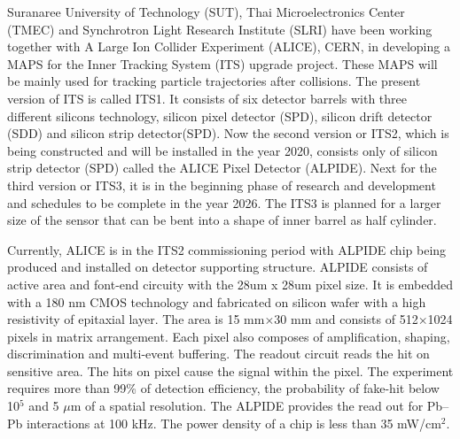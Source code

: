\documentclass[12pt,a4paper]{article}
\begin{document}
Suranaree University of Technology (SUT),  Thai Microelectronics Center (TMEC) and Synchrotron Light Research Institute (SLRI) have been working together with A Large Ion Collider Experiment (ALICE), CERN,  in developing a  MAPS for the Inner Tracking System (ITS) upgrade project.  These MAPS will be mainly used for tracking particle trajectories after collisions.  The present version of ITS is called ITS1. It consists of six detector barrels with three different silicons technology, silicon pixel detector (SPD), silicon drift detector (SDD) and silicon strip detector(SPD). Now the second version or ITS2,  which is being constructed and will be installed in the year 2020,  consists only of silicon strip detector (SPD) called the ALICE Pixel Detector (ALPIDE).  Next for the third version or ITS3, it is in the beginning phase of research and development and schedules to be complete in the year 2026. The ITS3 is planned for a larger size of the sensor that can be bent into a shape of inner barrel as half cylinder\cite{ALICE-PUBLIC-2018-013}. 

Currently, ALICE is in the ITS2 commissioning period with ALPIDE chip being produced and installed on detector supporting structure.  ALPIDE  consists of active area and font-end circuity with the   28um x 28um  pixel size.   It is embedded with a 180 nm CMOS technology and fabricated on silicon wafer with a high resistivity of epitaxial layer. The area is 15 mm×30 mm and consists of 512×1024 pixels in matrix arrangement. Each pixel also composes of amplification, shaping, discrimination and multi-event buffering. The readout circuit reads the hit on sensitive area. The hits on pixel cause the signal within the pixel. The experiment requires more than 99\% of detection efficiency, the probability of fake-hit below 10$^5$ and 5 $\mu$m of a spatial resolution. The ALPIDE provides the read out for Pb–Pb interactions at 100 kHz. The power density of a chip is less than 35 mW/cm$^2$.\cite{SNOEYS2018}
\end{document}
